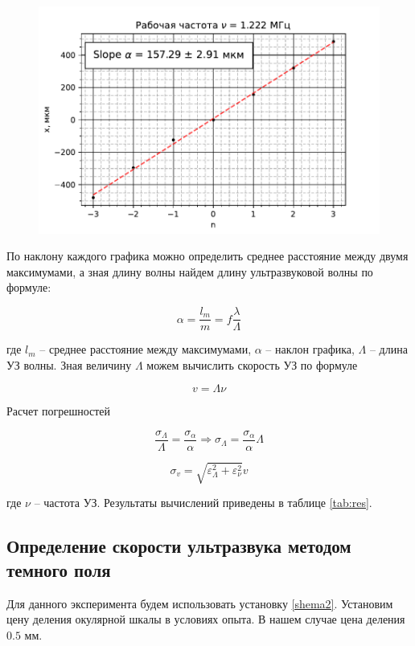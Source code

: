 	\begin{figure}
		\centering
		\includegraphics[scale=1]{./images/frequency4.ods.pdf}
		\label{fig:frequency4}
	\end{figure}

	По наклону каждого графика можно определить среднее расстояние между двумя максимумами, а зная длину волны найдем длину ультразвуковой волны по формуле:
	
	\[ \alpha = \frac{l_m}{m} = f \frac{\lambda}{\Lambda} \]
	
	где $l_m$ -- среднее расстояние между максимумами, $\alpha$ -- наклон графика, $\Lambda$ -- длина УЗ волны. Зная величину $\Lambda$ можем вычислить скорость УЗ по формуле
	
	\[v = \Lambda \nu \]
	
	Расчет погрешностей
	
	\[ \frac{\sigma_{\Lambda}}{\Lambda} = \frac{\sigma_{\alpha}}{\alpha} \Rightarrow \sigma_{\Lambda} = \frac{\sigma_{\alpha}}{\alpha} \Lambda \]
	
	\[ \sigma_{v} = \sqrt{\varepsilon_{\Lambda}^2 + \varepsilon_{\nu}^2} v \]
	
	где $\nu$ -- частота УЗ. Результаты вычислений приведены в таблице \ref{tab:res}.
	
	
	
	\subsection*{Определение скорости ультразвука методом темного поля}
	
	Для данного эксперимента будем использовать установку \ref{shema2}. Установим цену деления окулярной шкалы в условиях опыта. В нашем случае цена деления $0.5$ мм.
	
